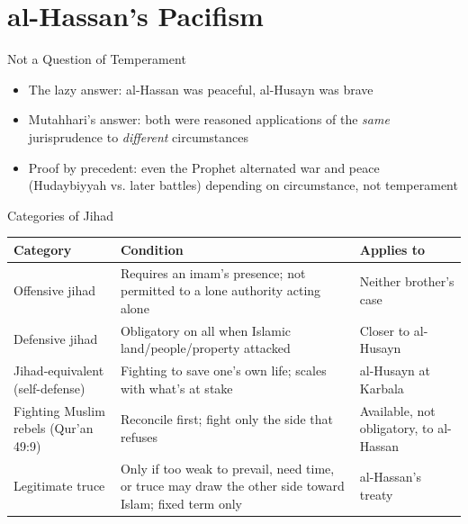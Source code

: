 \section{al-Hassan's Pacifism}

\begin{frame}{Not a Question of Temperament}
\begin{itemize}[itemsep=5pt]
  \item The lazy answer: al-Hassan was peaceful, al-Husayn was brave
  \item Mutahhari's answer: both were reasoned applications of the \emph{same} jurisprudence to \emph{different} circumstances
  \item Proof by precedent: even the Prophet alternated war and peace (Hudaybiyyah vs. later battles) depending on circumstance, not temperament
\end{itemize}
\end{frame}

\begin{frame}{Categories of Jihad}
\centering\scriptsize
\renewcommand{\arraystretch}{1.4}
\begin{tabular}{|p{3.1cm}|p{5.4cm}|p{2.6cm}|}
\hline
\textbf{Category} & \textbf{Condition} & \textbf{Applies to} \\\hline
Offensive jihad & Requires an imam's presence; not permitted to a lone authority acting alone & Neither brother's case \\\hline
Defensive jihad & Obligatory on all when Islamic land/people/property attacked & Closer to al-Husayn \\\hline
Jihad-equivalent (self-defense) & Fighting to save one's own life; scales with what's at stake & al-Husayn at Karbala \\\hline
Fighting Muslim rebels (Qur'an 49:9) & Reconcile first; fight only the side that refuses & Available, not obligatory, to al-Hassan \\\hline
Legitimate truce & Only if too weak to prevail, need time, or truce may draw the other side toward Islam; fixed term only & al-Hassan's treaty \\\hline
\end{tabular}
\vspace{0.3cm}
\end{frame}

